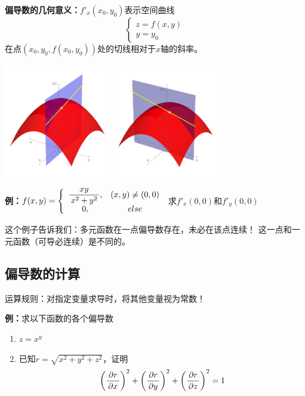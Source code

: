 \begin{thx}
	{\bf 偏导数的几何意义：}$f'_x(x_0,y_0)$表示空间曲线
	$$\left\{\begin{array}{l}
	z=f(x,y)\\ y=y_0
	\end{array}\right.$$
	在点$(x_0,y_0,f(x_0,y_0))$处的切线相对于$x$轴的斜率。
	\begin{center}
		\includegraphics[width=0.35\textwidth]{./images/ch9/px.pdf}\quad
		\includegraphics[width=0.35\textwidth]{./images/ch9/py.pdf}
	\end{center}
\end{thx}

{\bf 例：}$f(x,y)=\left\{\begin{array}{cc}
	\displaystyle\frac{\,{xy}\,}{\,{x^2+y^2}\,}, & (x,y)\ne (0,0)\\
	0, & else
\end{array}\right.$
求$f'_x(0,0)$和$f'_y(0,0)$

这个例子告诉我们：{\kaishu 多元函数在一点偏导数存在，未必在该点连续！}
这一点和一元函数（可导必连续）是不同的。

\subsection{偏导数的计算}

运算规则：对指定变量求导时，将其他变量视为常数！

{\bf 例：}求以下函数的各个偏导数
\begin{enumerate}[(1)]
  \setlength{\itemindent}{1cm}
  \item $z=x^y$
  \item 已知$r=\sqrt{x^2+y^2+z^2}$，证明
	$$\left(\displaystyle\frac{\,{\partial r}\,}{\,{\partial x}\,}\right)^2+\left(\displaystyle\frac{\,{\partial r}\,}{\,{\partial y}\,}\right)^2+\left(\displaystyle\frac{\,{\partial
	r}\,}{\,{\partial z}\,}\right)^2=1$$
\end{enumerate}

